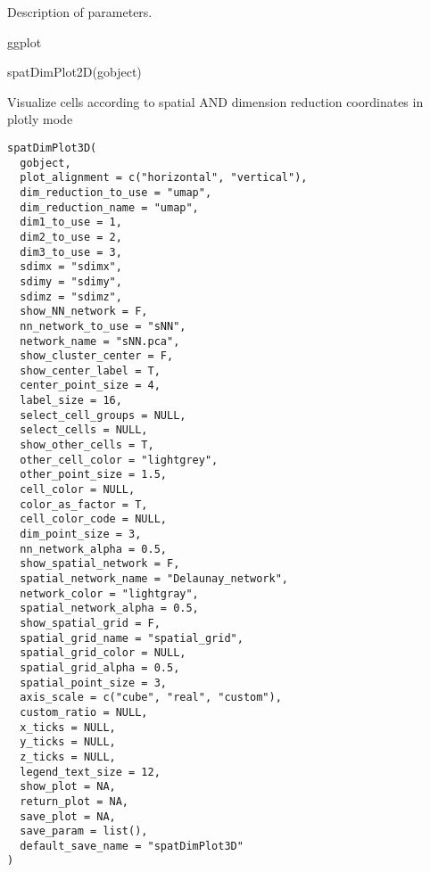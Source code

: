 \documentclass[a4paper]{book}
\begin{document}
%
\begin{Details}\relax
Description of parameters.
\end{Details}
%
\begin{Value}
ggplot
\end{Value}
%
\begin{SeeAlso}\relax
{}
\end{SeeAlso}
%
\begin{Examples}
\begin{ExampleCode}
    spatDimPlot2D(gobject)
\end{ExampleCode}
\end{Examples}
%
\begin{Description}\relax
Visualize cells according to spatial AND dimension reduction coordinates in plotly mode
\end{Description}
%
\begin{Usage}
\begin{verbatim}
spatDimPlot3D(
  gobject,
  plot_alignment = c("horizontal", "vertical"),
  dim_reduction_to_use = "umap",
  dim_reduction_name = "umap",
  dim1_to_use = 1,
  dim2_to_use = 2,
  dim3_to_use = 3,
  sdimx = "sdimx",
  sdimy = "sdimy",
  sdimz = "sdimz",
  show_NN_network = F,
  nn_network_to_use = "sNN",
  network_name = "sNN.pca",
  show_cluster_center = F,
  show_center_label = T,
  center_point_size = 4,
  label_size = 16,
  select_cell_groups = NULL,
  select_cells = NULL,
  show_other_cells = T,
  other_cell_color = "lightgrey",
  other_point_size = 1.5,
  cell_color = NULL,
  color_as_factor = T,
  cell_color_code = NULL,
  dim_point_size = 3,
  nn_network_alpha = 0.5,
  show_spatial_network = F,
  spatial_network_name = "Delaunay_network",
  network_color = "lightgray",
  spatial_network_alpha = 0.5,
  show_spatial_grid = F,
  spatial_grid_name = "spatial_grid",
  spatial_grid_color = NULL,
  spatial_grid_alpha = 0.5,
  spatial_point_size = 3,
  axis_scale = c("cube", "real", "custom"),
  custom_ratio = NULL,
  x_ticks = NULL,
  y_ticks = NULL,
  z_ticks = NULL,
  legend_text_size = 12,
  show_plot = NA,
  return_plot = NA,
  save_plot = NA,
  save_param = list(),
  default_save_name = "spatDimPlot3D"
)
\end{verbatim}
\end{Usage}
%
\end{document}
